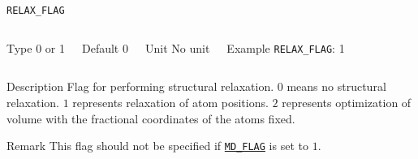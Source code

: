 \documentclass[xcolor=dvipsnames,t]{beamer}
\begin{document}
\begin{frame}[allowframebreaks]{\texttt{RELAX\_FLAG}} \label{RELAX_FLAG}
\vspace*{-12pt}
\begin{columns}
\begin{block}{Type}
0 or 1
\end{block}

\begin{block}{Default}
0
\end{block}

\begin{block}{Unit}
No unit
\end{block}

\begin{block}{Example}
\texttt{RELAX\_FLAG}: 1
\end{block}
\end{columns}

\begin{block}{Description}
Flag for performing structural relaxation. $0$ means no structural relaxation. $1$ represents relaxation of atom positions. $2$ represents optimization of volume with the fractional coordinates of the atoms fixed.
\end{block}

\begin{block}{Remark}
This flag should not be specified if \hyperlink{MD_FLAG}{\texttt{MD\_FLAG}} is set to $1$. 
\end{block}

\end{frame}
\end{document}
